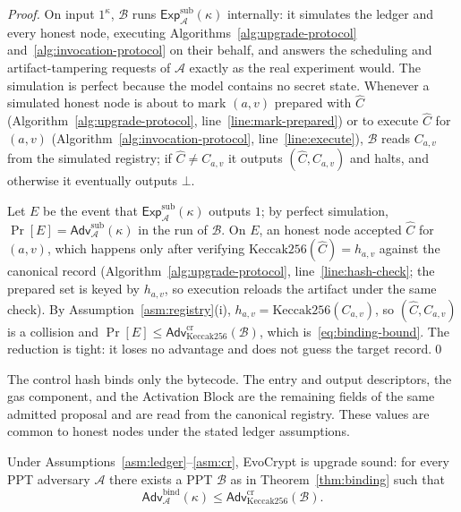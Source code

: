 \documentclass[runningheads]{llncs}
\begin{document}
\begin{proof}
On input $1^{\kappa}$, $\mathcal{B}$ runs $\mathsf{Exp}^{\mathrm{sub}}_{\mathcal{A}}(\kappa)$ internally: it simulates the ledger and every honest node, executing Algorithms~\ref{alg:upgrade-protocol} and~\ref{alg:invocation-protocol} on their behalf, and answers the scheduling and artifact-tampering requests of $\mathcal{A}$ exactly as the real experiment would. The simulation is perfect because the model contains no secret state. Whenever a simulated honest node is about to mark $(a,v)$ prepared with $\widehat{C}$ (Algorithm~\ref{alg:upgrade-protocol}, line~\ref{line:mark-prepared}) or to execute $\widehat{C}$ for $(a,v)$ (Algorithm~\ref{alg:invocation-protocol}, line~\ref{line:execute}), $\mathcal{B}$ reads $C_{a,v}$ from the simulated registry; if $\widehat{C}\neq C_{a,v}$ it outputs $(\widehat{C},C_{a,v})$ and halts, and otherwise it eventually outputs $\bot$.

Let $E$ be the event that $\mathsf{Exp}^{\mathrm{sub}}_{\mathcal{A}}(\kappa)$ outputs $1$; by perfect simulation, $\Pr[E]=\mathsf{Adv}^{\mathrm{sub}}_{\mathcal{A}}(\kappa)$ in the run of $\mathcal{B}$. On $E$, an honest node accepted $\widehat{C}$ for $(a,v)$, which happens only after verifying $\mathrm{Keccak256}(\widehat{C})=h_{a,v}$ against the canonical record (Algorithm~\ref{alg:upgrade-protocol}, line~\ref{line:hash-check}; the prepared set is keyed by $h_{a,v}$, so execution reloads the artifact under the same check). By Assumption~\ref{asm:registry}(i), $h_{a,v}=\mathrm{Keccak256}(C_{a,v})$, so $(\widehat{C},C_{a,v})$ is a collision and $\Pr[E]\le\mathsf{Adv}^{\mathrm{cr}}_{\mathrm{Keccak256}}(\mathcal{B})$, which is~\eqref{eq:binding-bound}. The reduction is tight: it loses no advantage and does not guess the target record.\qed
\end{proof}

The control hash binds only the bytecode. The entry and output descriptors, the gas component, and the Activation Block are the remaining fields of the same admitted proposal and are read from the canonical registry. These values are common to honest nodes under the stated ledger assumptions.

\begin{theorem}
\label{thm:soundness}
Under Assumptions~\ref{asm:ledger}--\ref{asm:cr}, EvoCrypt is upgrade sound: for every PPT adversary $\mathcal{A}$ there exists a PPT $\mathcal{B}$ as in Theorem~\ref{thm:binding} such that
\begin{equation}
\mathsf{Adv}^{\mathrm{bind}}_{\mathcal{A}}(\kappa)\le\mathsf{Adv}^{\mathrm{cr}}_{\mathrm{Keccak256}}(\mathcal{B}).
\label{eq:soundness-bound}
\end{equation}
\end{theorem}
\end{document}
